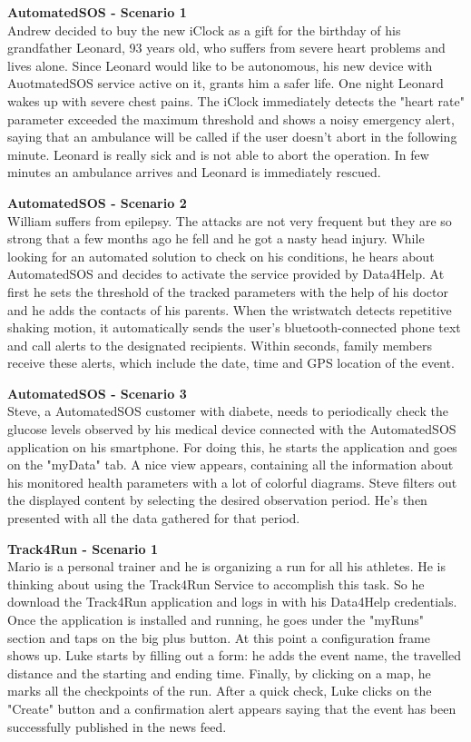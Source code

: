 \textbf{AutomatedSOS - Scenario 1} \\
Andrew decided to buy the new iClock as a gift for the birthday of his grandfather Leonard, 93
years old, who suffers from severe heart problems and lives alone. Since Leonard would like to be autonomous, his new device with AuotmatedSOS service active on it, grants him a safer life.
One night Leonard wakes up with severe chest pains. The iClock immediately detects the "heart rate" parameter exceeded the maximum threshold and shows a noisy emergency alert, saying that an ambulance will be called if the user doesn't abort in the following minute. Leonard is really sick and is not able to abort the operation. In few minutes an ambulance arrives and Leonard is immediately rescued.

\textbf{AutomatedSOS - Scenario 2} \\
William suffers from epilepsy. The attacks are not very frequent but they are so strong that a few months ago he fell and he got a nasty head injury. While looking for an automated solution to check on his conditions, he hears about AutomatedSOS and decides to activate the service provided by Data4Help.
At first he sets the threshold of the tracked parameters with the help of his doctor and he adds the contacts of his parents. When the wristwatch detects repetitive shaking motion, it automatically sends the user’s bluetooth-connected phone text and call alerts to the designated recipients. Within seconds, family members receive these alerts, which include the date, time and GPS location of the event.

\textbf{AutomatedSOS - Scenario 3} \\
Steve, a AutomatedSOS customer with diabete, needs to periodically check the glucose levels observed by his medical device connected with the AutomatedSOS application on his smartphone. For doing this, he starts the application and goes on the "myData" tab. A nice view appears, containing all the information about his monitored health parameters with a lot of colorful diagrams. Steve filters out the displayed content by selecting the desired observation period. He's then presented with all the data gathered for that period. 

\textbf{Track4Run - Scenario 1} \\
Mario is a personal trainer and he is organizing a run for all his athletes. He is thinking about using the Track4Run Service to accomplish this task. So he download the Track4Run application and logs in with his Data4Help credentials. Once the application is installed and running, he goes under the "myRuns" section and taps on the big plus button. 
At this point a configuration frame shows up. Luke starts by filling out a form: he adds the event name, the travelled distance and the starting and ending time. Finally, by clicking on a map, he marks all the checkpoints of the run.
After a quick check, Luke clicks on the "Create" button and a confirmation alert appears saying that the event has been successfully published in the news feed.


